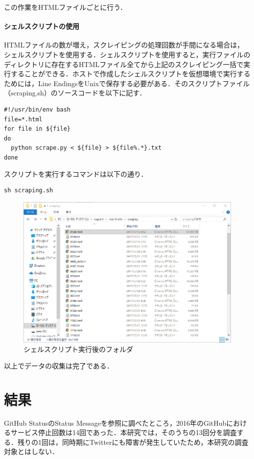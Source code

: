 この作業をHTMLファイルごとに行う．

\newpage
\subsubsection{シェルスクリプトの使用}
HTMLファイルの数が増え，スクレイピングの処理回数が手間になる場合は，シェルスクリプトを使用する．シェルスクリプトを使用すると，実行ファイルのディレクトリに存在するHTMLファイル全てから上記のスクレイピング一括で実行することができる．ホストで作成したシェルスクリプトを仮想環境で実行するためには，Line EndingsをUnixで保存する必要がある．そのスクリプトファイル（scraping.sh）のソースコードを以下に記す．
\begin{lstlisting}[basicstyle=\ttfamily\footnotesize, frame=single]
#!/usr/bin/env bash
file=*.html
for file in ${file}
do
  python scrape.py < ${file} > ${file%.*}.txt
done
\end{lstlisting}

\newpage
スクリプトを実行するコマンドは以下の通り．
\begin{lstlisting}[basicstyle=\ttfamily\footnotesize, frame=single]
sh scraping.sh
\end{lstlisting}
\begin{figure}[htb]
\centering
\includegraphics[width=13cm]{img/shell.png}
\caption{シェルスクリプト実行後のフォルダ}
\end{figure}
以上でデータの収集は完了である．

\chapter{結果}
GitHub StatusのStatus Messageを参照に調べたところ，2016年のGitHubにおけるサービス停止回数は14回であった．本研究では，そのうちの13回分を調査する．残りの1回は，同時期にTwitterにも障害が発生していたため，本研究の調査対象とはしない．

